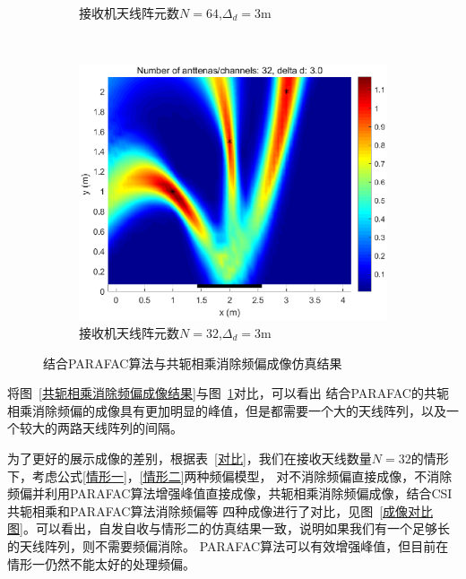 \begin{figure}[H]
\begin{subfigure}[t]{.45\linewidth}
    \caption{接收机天线阵元数$N=64$,$\Delta_d = 3\text{m}$}
  \end{subfigure}
  \\
  \begin{subfigure}[t]{.45\linewidth}
    \centering
    \includegraphics[width=1\textwidth]{figures/TPF/N32d3.eps}
    \caption{接收机天线阵元数$N=32$,$\Delta_d = 3\text{m}$}
  \end{subfigure}
  \caption{结合PARAFAC算法与共轭相乘消除频偏成像仿真结果}\label{结合PARAFAC算法与共轭相乘消除频偏成像仿真结果}
\end{figure}


将图~\ref{共轭相乘消除频偏成像结果}与图~\ref{结合PARAFAC算法与共轭相乘消除频偏成像仿真结果}对比，可以看出
结合PARAFAC的共轭相乘消除频偏的成像具有更加明显的峰值，但是都需要一个大的天线阵列，以及一个较大的两路天线阵列的间隔。


为了更好的展示成像的差别，根据表~\ref{对比}，我们在接收天线数量$N=32$的情形下，考虑公式\eqref{情形一}，\eqref{情形二}两种频偏模型，
对不消除频偏直接成像，不消除频偏并利用PARAFAC算法增强峰值直接成像，共轭相乘消除频偏成像，结合CSI共轭相乘和PARAFAC算法消除频偏等
四种成像进行了对比，见图~\ref{成像对比图}。可以看出，自发自收与情形二的仿真结果一致，说明如果我们有一个足够长的天线阵列，则不需要频偏消除。
PARAFAC算法可以有效增强峰值，但目前在情形一仍然不能太好的处理频偏。


